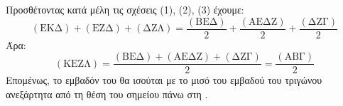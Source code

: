Προσθέτοντας κατά μέλη τις σχέσεις (1), (2), (3) έχουμε:
\[ (\text{ΕΚΔ})+(\text{ΕΖΔ})+(\text{ΔΖΛ})=\frac{(\text{ΒΕΔ})}{2}+\frac{(\text{ΑΕΔΖ})}{2}+\frac{(\text{ΔΖΓ})}{2} \]
Άρα:
\[ (\text{ΚΕΖΛ}) = \frac{(\text{ΒΕΔ})+(\text{ΑΕΔΖ})+(\text{ΔΖΓ})}{2} = \frac{(\text{ΑΒΓ})}{2} \]
Επομένως, το εμβαδόν του  θα ισούται με το μισό του εμβαδού του τριγώνου  ανεξάρτητα από τη θέση του σημείου  πάνω στη .